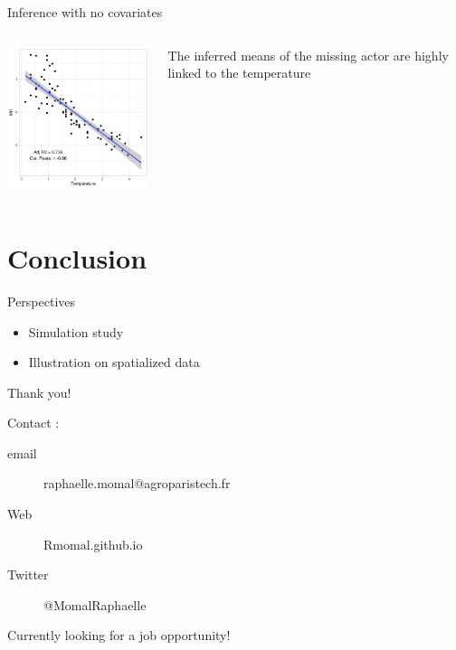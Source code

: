 \documentclass[11pt]{beamer}
\begin{document}
\begin{frame}{Inference with no covariates}

\begin{columns}
\begin{column}{0.5\linewidth}
\includegraphics[width=6cm]{images/Barents_missing.png}
\end{column}

\begin{column}{0.4\linewidth}
The inferred means of the missing actor are highly linked to the temperature
\end{column}

\end{columns}
\end{frame}
\section{Conclusion}
\begin{frame}{Perspectives}
\begin{itemize}
\item Simulation study
\item Illustration on spatialized data
\end{itemize}
\end{frame}

\begin{frame}
\begin{center}
\Large{Thank you!}    
\end{center}

\bigskip
\bigskip

\small{
Contact :\\
\begin{description}
\item[email] raphaelle.momal@agroparistech.fr
\item[Web]Rmomal.github.io
\item[Twitter] @MomalRaphaelle\\
\end{description}}

\bigskip

\begin{center}
\footnotesize{Currently looking for a job opportunity!}
\end{center}
\end{frame}
\end{document}

